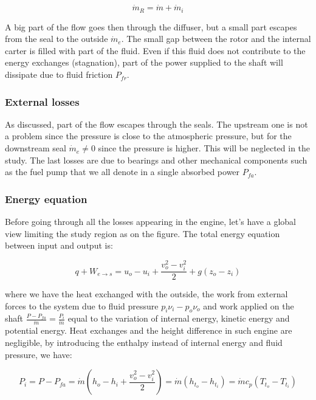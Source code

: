 \begin{equation}
\dot{m}_R = \dot{m} + \dot{m}_i
\end{equation}

A big part of the flow goes then through the diffuser, but a small part escapes from the seal to the outside $\dot{m}_e$. The small gap between the rotor and the internal carter is filled with part of the fluid. Even if this fluid does not contribute to the energy exchanges (stagnation), part of the power supplied to the shaft will dissipate due to fluid friction $P_{fr}$. 

\subsubsection{External losses}
As discussed, part of the flow escapes through the seals. The upstream one is not a problem since the pressure is close to the atmospheric pressure, but for the downstream seal $\dot{m}_e \neq 0$ since the pressure is higher. This will be neglected in the study. The last losses are due to bearings and other mechanical components such as the fuel pump that we all denote in a single absorbed power $P_{fa}$. 

\subsubsection{Energy equation}
Before going through all the losses appearing in the engine, let's have a global view limiting the study region as on the figure. The total energy equation between input and output is: 

\begin{equation}
q + W_{e\rightarrow s} = u_o - u_i + \frac{v_o ^2 - v_i^2}{2} + g(z_o - z_i)
\end{equation}

where we have the heat exchanged with the outside, the work from external forces to the system due to fluid pressure $p_i \nu _i - p_o\nu_o$ and work applied on the shaft $\frac{P - P_{fa}}{\dot{m}} =  \frac{P_i}{\dot{m}}$ equal to the variation of internal energy, kinetic energy and potential energy. Heat exchanges and the height difference in such engine are negligible, by introducing the enthalpy instead of internal energy and fluid pressure, we have: 

\begin{equation}
P_i = P - P_{fa} = \dot{m}\left( h_o - h_i + \frac{v_o^2 - v_i^2}{2} \right) = \dot{m} (h_{t_o} - h_{t_i}) = \dot{m} c_p (T_{t_o} - T_{t_i})
\end{equation}

